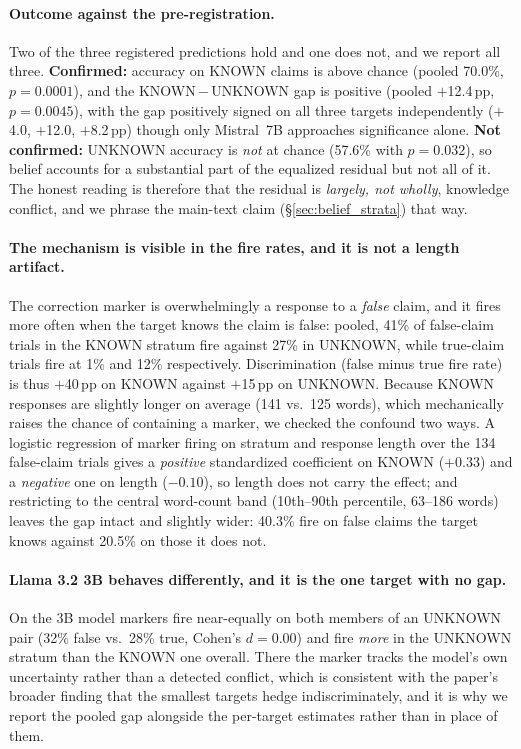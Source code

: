 \paragraph{Outcome against the pre-registration.} Two of the three registered predictions hold and one does not, and we report all three. \textbf{Confirmed:} accuracy on KNOWN claims is above chance (pooled 70.0\%, $p\!=\!0.0001$), and the KNOWN\,$-$\,UNKNOWN gap is positive (pooled $+$12.4\,pp, $p\!=\!0.0045$), with the gap positively signed on all three targets independently ($+$4.0, $+$12.0, $+$8.2\,pp) though only Mistral~7B approaches significance alone. \textbf{Not confirmed:} UNKNOWN accuracy is \emph{not} at chance (57.6\% with $p\!=\!0.032$), so belief accounts for a substantial part of the equalized residual but not all of it. The honest reading is therefore that the residual is \emph{largely, not wholly}, knowledge conflict, and we phrase the main-text claim (§\ref{sec:belief_strata}) that way.

\paragraph{The mechanism is visible in the fire rates, and it is not a length artifact.} The correction marker is overwhelmingly a response to a \emph{false} claim, and it fires more often when the target knows the claim is false: pooled, 41\% of false-claim trials in the KNOWN stratum fire against 27\% in UNKNOWN, while true-claim trials fire at 1\% and 12\% respectively. Discrimination (false minus true fire rate) is thus $+$40\,pp on KNOWN against $+$15\,pp on UNKNOWN. Because KNOWN responses are slightly longer on average (141 vs.\ 125 words), which mechanically raises the chance of containing a marker, we checked the confound two ways. A logistic regression of marker firing on stratum and response length over the 134 false-claim trials gives a \emph{positive} standardized coefficient on KNOWN ($+0.33$) and a \emph{negative} one on length ($-0.10$), so length does not carry the effect; and restricting to the central word-count band (10th--90th percentile, 63--186 words) leaves the gap intact and slightly wider: 40.3\% fire on false claims the target knows against 20.5\% on those it does not.

\paragraph{Llama 3.2 3B behaves differently, and it is the one target with no gap.} On the 3B model markers fire near-equally on both members of an UNKNOWN pair (32\% false vs.\ 28\% true, Cohen's $d\!=\!0.00$) and fire \emph{more} in the UNKNOWN stratum than the KNOWN one overall. There the marker tracks the model's own uncertainty rather than a detected conflict, which is consistent with the paper's broader finding that the smallest targets hedge indiscriminately, and it is why we report the pooled gap alongside the per-target estimates rather than in place of them.


